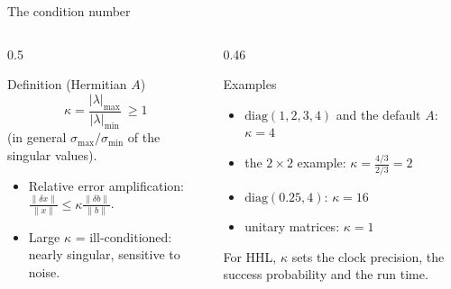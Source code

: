 \documentclass[aspectratio=169,11pt]{beamer}
\begin{document}
\begin{frame}{The condition number}
  \begin{columns}[T]
    \begin{column}{0.5\textwidth}
      \begin{block}{Definition (Hermitian $A$)}
        \[ \kappa = \frac{|\lambda|_{\max}}{|\lambda|_{\min}} \ \ge 1 \]
        (in general $\sigma_{\max}/\sigma_{\min}$ of the singular values).
      \end{block}
      \begin{itemize}
        \item Relative error amplification: $\frac{\|\delta x\|}{\|x\|} \le \kappa\frac{\|\delta b\|}{\|b\|}$.
        \item Large $\kappa$ = ill-conditioned: nearly singular, sensitive to noise.
      \end{itemize}
    \end{column}
    \begin{column}{0.46\textwidth}
      \begin{exampleblock}{Examples}
        \begin{itemize}
          \item $\mathrm{diag}(1, 2, 3, 4)$ and the default $A$: $\kappa = 4$
          \item the $2\times2$ example: $\kappa = \frac{4/3}{2/3} = 2$
          \item $\mathrm{diag}(0.25, 4)$: $\kappa = 16$
          \item unitary matrices: $\kappa = 1$
        \end{itemize}
      \end{exampleblock}
      \small For HHL, $\kappa$ sets the clock precision, the success probability and the run time.
    \end{column}
  \end{columns}
\end{frame}

\end{document}
